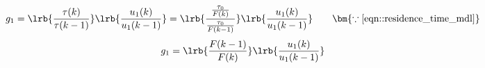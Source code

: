 \begin{align*}
        g_1 &= \lrb{\frac{\tau(k)}{\tau(k-1)}}
                                \lrb{\frac{u_1(k)}{u_1(k-1)}}
                = \lrb{\frac{\frac{\tau_0}{F(k)}}{\frac{\tau_0}{F(k-1)}}} \lrb{\frac{u_1(k)}{u_1(k-1)}}
                \qquad \bm{\because \ref{eqn::residence_time_mdl}}
\end{align*}
\begin{align}
        g_1 &= \lrb{\frac{F(k-1)}{F(k)}} \lrb{\frac{u_1(k)}{u_1(k-1)}}
\end{align}
